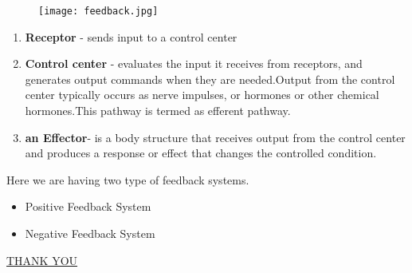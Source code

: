 \documentclass[12pts]{article}
\begin{document}
\begin{flushleft}
\begin{figure}[h]
\centering
\texttt{[image: feedback.jpg]}
\end{figure}
\begin{enumerate}
\item \textbf{Receptor} - sends input to a control center
\item \textbf{Control center} - evaluates the input it receives from receptors, and 
generates output commands when they are needed.Output from 
the control center typically occurs as nerve impulses, or hormones or other chemical hormones.This pathway is termed as efferent pathway.
\item \textbf{an Effector}-  is a body structure that receives output from the control center and produces a response or effect that changes the controlled condition.\\
\end{enumerate}
Here we are having two type of feedback systems.
\begin{itemize}
\item Positive Feedback System
\item Negative Feedback System
\end{itemize}
\end{flushleft}
\vspace{10 mm}
\centering
\begin{LARGE}
\underline{THANK YOU}
\end{LARGE}
\end{document}
